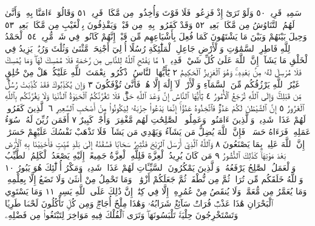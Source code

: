 سَمِيعࣱ قَرِيبࣱ ٥٠ وَلَوْ تَرَىٰٓ إِذْ فَزِعُوا۟ فَلَا فَوْتَ وَأُخِذُوا۟ مِن
مَّكَانࣲ قَرِيبࣲ ٥١ وَقَالُوٓا۟ ءَامَنَّا بِهِۦ وَأَنَّىٰ لَهُمُ ٱلتَّنَاوُشُ مِن
مَّكَانِۭ بَعِيدࣲ ٥٢ وَقَدْ كَفَرُوا۟ بِهِۦ مِن قَبْلُۖ وَيَقْذِفُونَ
بِٱلْغَيْبِ مِن مَّكَانِۭ بَعِيدࣲ ٥٣ وَحِيلَ بَيْنَهُمْ وَبَيْنَ مَا يَشْتَهُونَ
كَمَا فُعِلَ بِأَشْيَاعِهِم مِّن قَبْلُۚ إِنَّهُمْ كَانُوا۟ فِي شَكࣲّ مُّرِيبِۭ ٥٤
ٱلْحَمْدُ لِلَّهِ فَاطِرِ ٱلسَّمَٰوَٰتِ وَٱلْأَرْضِ جَاعِلِ ٱلْمَلَٰٓئِكَةِ رُسُلًا أُو۟لِيٓ
أَجْنِحَةࣲ مَّثْنَىٰ وَثُلَٰثَ وَرُبَٰعَۚ يَزِيدُ فِي ٱلْخَلْقِ مَا يَشَآءُۚ إِنَّ ٱللَّهَ عَلَىٰ
كُلِّ شَيْءࣲ قَدِيرࣱ ١ مَّا يَفْتَحِ ٱللَّهُ لِلنَّاسِ مِن رَّحْمَةࣲ فَلَا مُمْسِكَ لَهَاۖ
وَمَا يُمْسِكْ فَلَا مُرْسِلَ لَهُۥ مِنۢ بَعْدِهِۦۚ وَهُوَ ٱلْعَزِيزُ ٱلْحَكِيمُ ٢
يَٰٓأَيُّهَا ٱلنَّاسُ ٱذْكُرُوا۟ نِعْمَتَ ٱللَّهِ عَلَيْكُمْۚ هَلْ مِنْ خَٰلِقٍ غَيْرُ ٱللَّهِ
يَرْزُقُكُم مِّنَ ٱلسَّمَآءِ وَٱلْأَرْضِۚ لَآ إِلَٰهَ إِلَّا هُوَۖ فَأَنَّىٰ تُؤْفَكُونَ ٣
وَإِن يُكَذِّبُوكَ فَقَدْ كُذِّبَتْ رُسُلࣱ مِّن قَبْلِكَۚ وَإِلَى ٱللَّهِ تُرْجَعُ
ٱلْأُمُورُ ٤ يَٰٓأَيُّهَا ٱلنَّاسُ إِنَّ وَعْدَ ٱللَّهِ حَقࣱّۖ فَلَا تَغُرَّنَّكُمُ ٱلْحَيَوٰةُ
ٱلدُّنْيَا وَلَا يَغُرَّنَّكُم بِٱللَّهِ ٱلْغَرُورُ ٥ إِنَّ ٱلشَّيْطَٰنَ لَكُمْ عَدُوࣱّ فَٱتَّخِذُوهُ
عَدُوًّاۚ إِنَّمَا يَدْعُوا۟ حِزْبَهُۥ لِيَكُونُوا۟ مِنْ أَصْحَٰبِ ٱلسَّعِيرِ ٦ ٱلَّذِينَ
كَفَرُوا۟ لَهُمْ عَذَابࣱ شَدِيدࣱۖ وَٱلَّذِينَ ءَامَنُوا۟ وَعَمِلُوا۟ ٱلصَّٰلِحَٰتِ لَهُم
مَّغْفِرَةࣱ وَأَجْرࣱ كَبِيرٌ ٧ أَفَمَن زُيِّنَ لَهُۥ سُوٓءُ عَمَلِهِۦ فَرَءَاهُ حَسَنࣰاۖ فَإِنَّ
ٱللَّهَ يُضِلُّ مَن يَشَآءُ وَيَهْدِي مَن يَشَآءُۖ فَلَا تَذْهَبْ نَفْسُكَ عَلَيْهِمْ
حَسَرَٰتٍۚ إِنَّ ٱللَّهَ عَلِيمُۢ بِمَا يَصْنَعُونَ ٨ وَٱللَّهُ ٱلَّذِيٓ أَرْسَلَ
ٱلرِّيَٰحَ فَتُثِيرُ سَحَابࣰا فَسُقْنَٰهُ إِلَىٰ بَلَدࣲ مَّيِّتࣲ فَأَحْيَيْنَا بِهِ ٱلْأَرْضَ
بَعْدَ مَوْتِهَاۚ كَذَٰلِكَ ٱلنُّشُورُ ٩ مَن كَانَ يُرِيدُ ٱلْعِزَّةَ فَلِلَّهِ ٱلْعِزَّةُ جَمِيعًاۚ
إِلَيْهِ يَصْعَدُ ٱلْكَلِمُ ٱلطَّيِّبُ وَٱلْعَمَلُ ٱلصَّٰلِحُ يَرْفَعُهُۥۚ وَٱلَّذِينَ
يَمْكُرُونَ ٱلسَّيِّـَٔاتِ لَهُمْ عَذَابࣱ شَدِيدࣱۖ وَمَكْرُ أُو۟لَٰٓئِكَ هُوَ يَبُورُ ١٠
وَٱللَّهُ خَلَقَكُم مِّن تُرَابࣲ ثُمَّ مِن نُّطْفَةࣲ ثُمَّ جَعَلَكُمْ أَزْوَٰجࣰاۚ
وَمَا تَحْمِلُ مِنْ أُنثَىٰ وَلَا تَضَعُ إِلَّا بِعِلْمِهِۦۚ وَمَا يُعَمَّرُ مِن مُّعَمَّرࣲ
وَلَا يُنقَصُ مِنْ عُمُرِهِۦٓ إِلَّا فِي كِتَٰبٍۚ إِنَّ ذَٰلِكَ عَلَى ٱللَّهِ يَسِيرࣱ ١١
وَمَا يَسْتَوِي ٱلْبَحْرَانِ هَٰذَا عَذْبࣱ فُرَاتࣱ سَآئِغࣱ شَرَابُهُۥ وَهَٰذَا
مِلْحٌ أُجَاجࣱۖ وَمِن كُلࣲّ تَأْكُلُونَ لَحْمࣰا طَرِيࣰّا وَتَسْتَخْرِجُونَ
حِلْيَةࣰ تَلْبَسُونَهَاۖ وَتَرَى ٱلْفُلْكَ فِيهِ مَوَاخِرَ لِتَبْتَغُوا۟ مِن فَضْلِهِۦ
